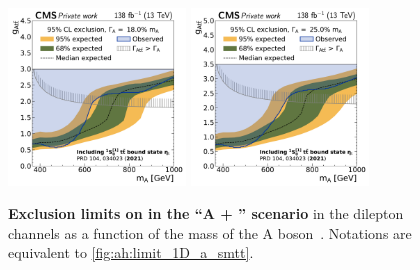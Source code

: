 \begin{figure}[!ph]
    \\
    \includegraphics[width=0.42\textwidth]{figures/ah/limits_etat_w2p8/A_limit_w18p0_g-scan_highrange.pdf}%
    \hspace*{0.05\textwidth}%
    \includegraphics[width=0.42\textwidth]{figures/ah/limits_etat_w2p8/A_limit_w25p0_g-scan_highrange.pdf}
    \caption{%
        \textbf{Exclusion limits on \gAtt in the ``A + \etat'' scenario} in the dilepton channels as a function of the mass of the A boson~\cite{CMS:HIG-22-013}. Notations are equivalent to \cref{fig:ah:limit_1D_a_smtt}.
    }
    \label{fig:ah:limit_1D_a_etat}
\end{figure}
    
